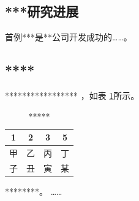 \subsection{***研究进展}

首例***是**公司开发成功的……。

\subsection{****}
\esubsection{***}


*****************\cite{Jiang2005Size} ，如表 \ref{tab:category}所示。

\begin{table}
  \centering
  \caption{*****} \label{tab:category}
  \begin{tabular*}{0.9\textwidth}{@{\extracolsep{\fill}}cccc}
  \toprule
    1			&2		&3		&5 \\
  \midrule
    甲			&乙	    &丙		&丁 \\
    子		    &丑		&寅  	&某\\
  \bottomrule
  \end{tabular*}
\end{table}

********。
……

